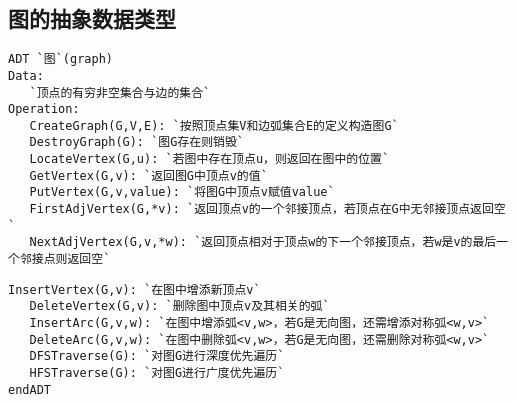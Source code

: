 \subsection{图的抽象数据类型}

\begin{frame}[fragile]\ft{\subsecname}
\begin{lstlisting}[frame=tb]
ADT `图`(graph)
Data: 
   `顶点的有穷非空集合与边的集合`
Operation:
   CreateGraph(G,V,E): `按照顶点集V和边弧集合E的定义构造图G`
   DestroyGraph(G): `图G存在则销毁`
   LocateVertex(G,u): `若图中存在顶点u，则返回在图中的位置`
   GetVertex(G,v): `返回图G中顶点v的值`
   PutVertex(G,v,value): `将图G中顶点v赋值value`
   FirstAdjVertex(G,*v): `返回顶点v的一个邻接顶点，若顶点在G中无邻接顶点返回空`
   NextAdjVertex(G,v,*w): `返回顶点相对于顶点w的下一个邻接顶点，若w是v的最后一个邻接点则返回空`
\end{lstlisting}
\end{frame}

\begin{frame}[fragile]\ft{\subsecname}
\begin{lstlisting}[frame=tb]
   InsertVertex(G,v): `在图中增添新顶点v`
   DeleteVertex(G,v): `删除图中顶点v及其相关的弧`
   InsertArc(G,v,w): `在图中增添弧<v,w>，若G是无向图，还需增添对称弧<w,v>`
   DeleteArc(G,v,w): `在图中删除弧<v,w>，若G是无向图，还需删除对称弧<w,v>`
   DFSTraverse(G): `对图G进行深度优先遍历`
   HFSTraverse(G): `对图G进行广度优先遍历`
endADT
\end{lstlisting}
\end{frame}
